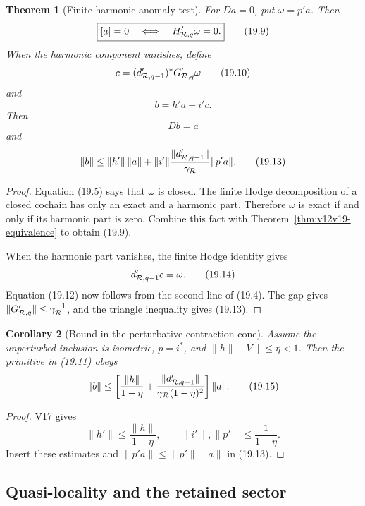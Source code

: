 \documentclass[11pt]{article}
\newtheorem{theorem}{Theorem}[section]
\newtheorem{corollary}[theorem]{Corollary}
\theoremstyle{remark}
\begin{document}
\begin{theorem}[Finite harmonic anomaly test]
\label{thm:v12v19-Hodge}
For \(Da=0\), put \(\omega=p'a\).  Then
\[
 \boxed{
 [a]=0
 \quad\Longleftrightarrow\quad
 H_{{\cal R},q}'\omega=0.}                                 \tag{19.9}
\]
When the harmonic component vanishes, define
\[
 c=(d_{{\cal R},q-1}')^*G_{{\cal R},q}'\omega              \tag{19.10}
\]
and
\[
                         b=h'a+i'c.                         \tag{19.11}
\]
Then
\[
                         Db=a                              \tag{19.12}
\]
and
\[
 \|b\|
 \le
 \|h'\|\,\|a\|
 +\|i'\|\frac{\|d_{{\cal R},q-1}'\|}{\gamma_{\cal R}}
            \|p'a\|.                                       \tag{19.13}
\]
\end{theorem}

\begin{proof}
Equation (19.5) says that \(\omega\) is closed.  The finite Hodge
decomposition of a closed cochain has only an exact and a harmonic
part.  Therefore \(\omega\) is exact if and only if its harmonic
part is zero.  Combine this fact with
Theorem~\ref{thm:v12v19-equivalence} to obtain (19.9).

When the harmonic part vanishes, the finite Hodge identity gives
\[
 d_{{\cal R},q-1}'c=\omega.                                \tag{19.14}
\]
Equation (19.12) now follows from the second line of (19.4).  The
gap gives
\(\|G_{{\cal R},q}'\|\le\gamma_{\cal R}^{-1}\), and the
triangle inequality gives (19.13).
\end{proof}

\begin{corollary}[Bound in the perturbative contraction cone]
\label{cor:v12v19-bound}
Assume the unperturbed inclusion is isometric, \(p=i^*\), and
\(\|h\|\|V\|\le\eta<1\).  Then the primitive in (19.11) obeys
\[
 \|b\|
 \le
 \left[
 \frac{\|h\|}{1-\eta}
 +
 \frac{\|d_{{\cal R},q-1}'\|}
      {\gamma_{\cal R}(1-\eta)^2}
 \right]\|a\|.                                              \tag{19.15}
\]
\end{corollary}

\begin{proof}
V17 gives
\[
 \|h'\|\le\frac{\|h\|}{1-\eta},\qquad
 \|i'\|,\|p'\|\le\frac1{1-\eta}.
\]
Insert these estimates and
\(\|p'a\|\le\|p'\|\|a\|\) in (19.13).
\end{proof}

\subsection{Quasi-locality and the retained sector}
\end{document}
